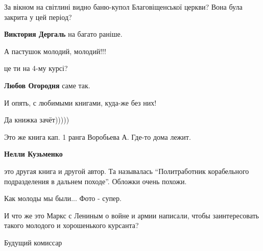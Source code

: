  
 
 
 
 

За вікном на світлині видно баню-купол Благовіщенської церкви? Вона була закрита у цей період?

\textbf{Виктория Дергаль} на багато раніше.

А пастушок молодий, молодий!!!

це ти на 4-му курсі?

\textbf{Любов Огородня} саме так.

И опять, с любимыми книгами, куда-же без них!

Да книжка зачёт)))))

Это же книга кап. 1 ранга Воробьева А. Где-то дома лежит.

\textbf{Нелли Кузьменко} 

это другая книга и другой автор. Та называлась \enquote{Политработник корабельного
подразделения в дальнем походе}. Обложки очень похожи.

Как молоды мы были... Фото - супер.


И что же это Маркс с Лениным о войне и армии написали, чтобы заинтересовать
такого молодого и хорошенького курсанта?

Будущий комиссар
